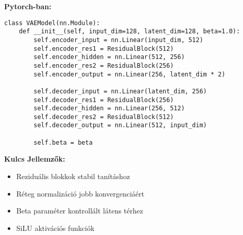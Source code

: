 \documentclass[aspectratio=169]{beamer}
\begin{document}
\begin{frame}[fragile]
\textbf{Pytorch-ban:}
\begin{lstlisting}
class VAEModel(nn.Module):
    def __init__(self, input_dim=128, latent_dim=128, beta=1.0):
        self.encoder_input = nn.Linear(input_dim, 512)
        self.encoder_res1 = ResidualBlock(512)
        self.encoder_hidden = nn.Linear(512, 256)
        self.encoder_res2 = ResidualBlock(256)
        self.encoder_output = nn.Linear(256, latent_dim * 2)
        
        self.decoder_input = nn.Linear(latent_dim, 256)
        self.decoder_res1 = ResidualBlock(256)
        self.decoder_hidden = nn.Linear(256, 512)
        self.decoder_res2 = ResidualBlock(512)
        self.decoder_output = nn.Linear(512, input_dim)
        
        self.beta = beta
\end{lstlisting}

\textbf{Kulcs Jellemzők:}
\begin{itemize}
    \item Reziduális blokkok stabil tanításhoz
    \item Réteg normalizáció jobb konvergenciáért
    \item Beta paraméter kontrollált látens térhez
    \item SiLU aktivációs funkciók
\end{itemize}
\end{frame}
\end{document}
